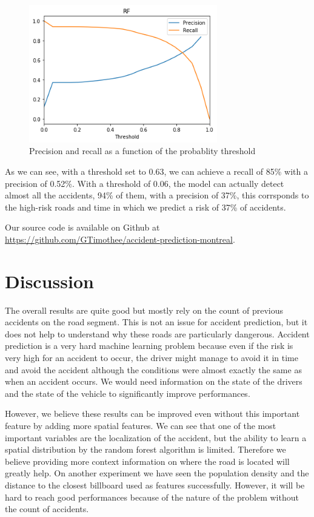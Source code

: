 \documentclass[conference]{IEEEtran}
\begin{document}
\begin{figure}[htbp]
\centerline{\includegraphics[height=6cm, keepaspectratio]{figures/pr.png}}
\caption{Precision and recall as a function of the probablity threshold}
\label{fig}
\end{figure}

As we can see, with a threshold set to 0.63, we can achieve a recall of 85\% with a precision of 0.52\%. With a threshold of 0.06, the model can actually detect almost all the accidents, 94\% of them, with a precision of 37\%, this corrsponds to the high-risk roads and time in which we predict a risk of 37\% of accidents.

 Our source code is available on Github at \href{https://github.com/GTimothee/accident-prediction-montreal}{https://github.com/GTimothee/accident-prediction-montreal}. 

\section{Discussion}
The overall results are quite good but mostly rely on the count of previous accidents on the road segment. This is not an issue for accident prediction, but it does not help to understand why these roads are particularly dangerous. Accident prediction is a very hard machine learning problem because even if the risk is very high for an accident to occur, the driver might manage to avoid it in time and avoid the accident although the conditions were almost exactly the same as when an accident occurs. We would need information on the state of the drivers and the state of the vehicle to significantly improve performances. 

However, we believe these results can be improved even without this important feature by adding more spatial features. We can see that one of the most important variables are the localization of the accident, but the ability to learn a spatial distribution by the random forest algorithm is limited. Therefore we believe providing more context information on where the road is located will greatly help. On another experiment we have seen the population density and the distance to the closest billboard used as features successfully. However, it will be hard to reach good performances because of the nature of the problem without the count of accidents.
\end{document}
